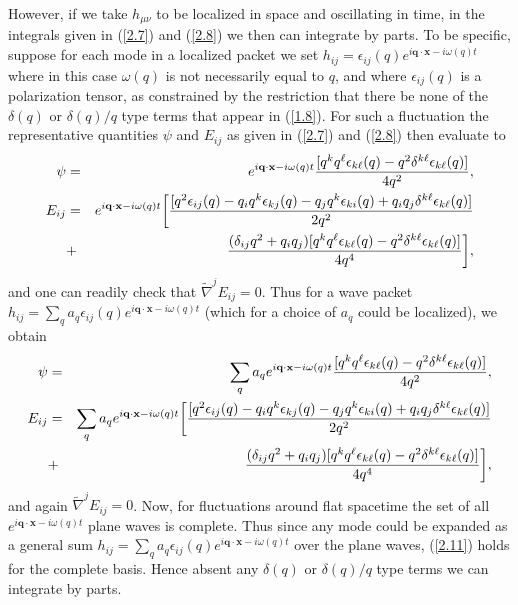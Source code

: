 \documentclass[aps,onecolumn,10pt]{revtex4}
\numberwithin{equation}{section}
\numberwithin{equation}{section}
\begin{document}
However, if we take $h_{\mu\nu}$  to be localized in space and oscillating in time, in the integrals given in (\ref{2.7}) and (\ref{2.8}) we then can integrate by parts. To be specific, suppose for each mode in a localized packet we set $h_{ij}=\epsilon_{ij}(q)e^{i\mathbf{q}\cdot\mathbf{x}-i\omega(q) t}$ where in this case $\omega(q)$ is not necessarily equal to $q$, and where $\epsilon_{ij}(q)$ is a polarization tensor, as constrained by the restriction that there be none of the $\delta(q)$ or $\delta(q)/q$ type terms that appear in (\ref{1.8}). For such a fluctuation the representative quantities $\psi$ and $E_{ij}$ as given in (\ref{2.7}) and (\ref{2.8}) then evaluate to
%
\begin{eqnarray}
\psi&=&e^{i\mathbf{q}\cdot\mathbf{x}-i\omega(q) t}\frac{[q^kq^{\ell}\epsilon_{k\ell}(q)-q^2\delta^{k\ell}\epsilon_{k\ell}(q)]}{4q^2},
\nonumber\\
E_{ij}&=&e^{i\mathbf{q}\cdot\mathbf{x}-i\omega(q) t}\bigg{[}\frac{[q^2\epsilon_{ij}(q)-q_iq^k\epsilon_{kj}(q)-q_jq^k\epsilon_{ki}(q)+q_iq_j\delta^{k\ell}\epsilon_{k\ell}(q)]}{2q^2}
\nonumber\\
&+&\frac{(\delta_{ij}q^2+q_iq_j)[q^kq^{\ell}\epsilon_{k\ell}(q)-q^2\delta^{k\ell}\epsilon_{k\ell}(q)]}{4q^4}\bigg{]},
\label{2.10}
\end{eqnarray}
%
and one can readily check that $\tilde{\nabla}^jE_{ij}=0$. Thus for a wave packet  $h_{ij}=\sum_qa_q\epsilon_{ij}(q)e^{i\mathbf{q}\cdot\mathbf{x}-i\omega(q) t}$ (which for a choice of $a_q$ could be localized), we obtain 
%
\begin{eqnarray}
\psi&=&\sum_qa_qe^{i\mathbf{q}\cdot\mathbf{x}-i\omega(q) t}\frac{[q^kq^{\ell}\epsilon_{k\ell}(q)-q^2\delta^{k\ell}\epsilon_{k\ell}(q)]}{4q^2},
\nonumber\\
E_{ij}&=&\sum_qa_qe^{i\mathbf{q}\cdot\mathbf{x}-i\omega(q) t}\bigg{[}\frac{[q^2\epsilon_{ij}(q)-q_iq^k\epsilon_{kj}(q)-q_jq^k\epsilon_{ki}(q)+q_iq_j\delta^{k\ell}\epsilon_{k\ell}(q)]}{2q^2}
\nonumber\\
&+&\frac{(\delta_{ij}q^2+q_iq_j)[q^kq^{\ell}\epsilon_{k\ell}(q)-q^2\delta^{k\ell}\epsilon_{k\ell}(q)]}{4q^4}\bigg{]},
\label{2.11}
\end{eqnarray}
%
and again $\tilde{\nabla}^jE_{ij}=0$. Now, for fluctuations around flat spacetime the set of all $e^{i\mathbf{q}\cdot\mathbf{x}-i\omega (q)t}$ plane waves is complete. Thus since any mode could be expanded as a general sum $h_{ij}=\sum_qa_q\epsilon_{ij}(q)e^{i\mathbf{q}\cdot\mathbf{x}-i\omega(q) t}$ over the plane waves, (\ref{2.11}) holds for the complete basis. Hence absent any $\delta(q)$ or $\delta (q)/q$ type terms we can  integrate by parts.
\end{document}
